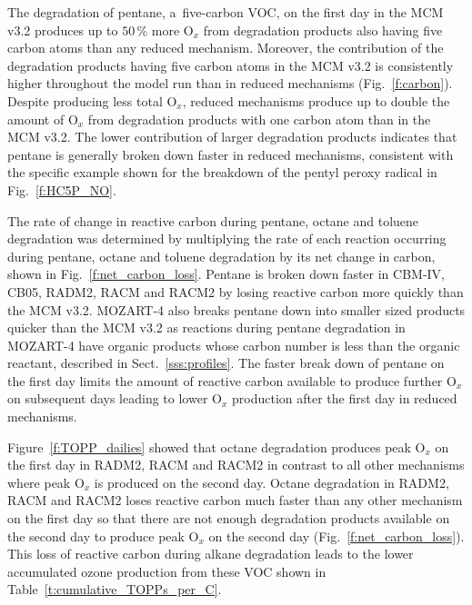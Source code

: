 \documentclass[acpd, online, hvmath]{copernicus}
\begin{document}
The degradation of pentane, a~five-carbon VOC, on the first day in the
MCM v3.2 produces up to $50$\,{\%} more O$_{x}$ from degradation
products also having five carbon atoms than any reduced mechanism.
Moreover, the contribution of the degradation products having five
carbon atoms in the MCM v3.2 is consistently higher throughout the
model run than in reduced mechanisms (Fig.~\ref{f:carbon}).  Despite
producing less total O$_{x}$, reduced mechanisms produce up to
double the amount of O$_{x}$ from degradation products with one
carbon atom than in the MCM v3.2.  The lower contribution of larger
degradation products indicates that pentane is generally broken down
faster in reduced mechanisms, consistent with the specific example
shown for the breakdown of the pentyl peroxy radical in
Fig.~\ref{f:HC5P_NO}.

The rate of change in reactive carbon during pentane, octane and
toluene degradation was determined by multiplying the rate of each
reaction occurring during pentane, octane and toluene degradation by
its net change in carbon, shown in Fig.~\ref{f:net_carbon_loss}.
Pentane is broken down faster in CBM-IV, CB05, RADM2, RACM and RACM2
by losing reactive carbon more quickly than the MCM v3.2.  MOZART-4
also breaks pentane down into smaller sized products quicker than the
MCM v3.2 as reactions during pentane degradation in MOZART-4 have
organic products whose carbon number is less than the organic
reactant, described in Sect.~\ref{sss:profiles}.  The faster break
down of pentane on the first day limits the amount of reactive carbon
available to produce further O$_{x}$ on subsequent days leading to
lower O$_{x}$ production after the first day in reduced mechanisms.

Figure~\ref{f:TOPP_dailies} showed that octane degradation produces
peak O$_{x}$ on the first day in RADM2, RACM and RACM2 in contrast
to all other mechanisms where peak O$_{x}$ is produced on the
second day.  Octane degradation in RADM2, RACM and RACM2 loses
reactive carbon much faster than any other mechanism on the first day
so that there are not enough degradation products available on the
second day to produce peak O$_{x}$ on the second day
(Fig.~\ref{f:net_carbon_loss}).  This loss of reactive carbon during
alkane degradation leads to the lower accumulated ozone production
from these VOC shown in Table~\ref{t:cumulative_TOPPs_per_C}.
\end{document}
